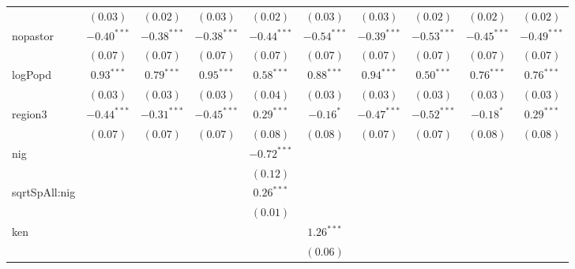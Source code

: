 \begin{sidewaystable}
\begin{center}
{\begin{tabular}{l c c c c c c c c c}
                  & $(0.03)$      & $(0.02)$      & $(0.03)$      & $(0.02)$      & $(0.03)$      & $(0.03)$      & $(0.02)$      & $(0.02)$      & $(0.02)$      \\
nopastor          & $-0.40^{***}$ & $-0.38^{***}$ & $-0.38^{***}$ & $-0.44^{***}$ & $-0.54^{***}$ & $-0.39^{***}$ & $-0.53^{***}$ & $-0.45^{***}$ & $-0.49^{***}$ \\
                  & $(0.07)$      & $(0.07)$      & $(0.07)$      & $(0.07)$      & $(0.07)$      & $(0.07)$      & $(0.07)$      & $(0.07)$      & $(0.07)$      \\
logPopd           & $0.93^{***}$  & $0.79^{***}$  & $0.95^{***}$  & $0.58^{***}$  & $0.88^{***}$  & $0.94^{***}$  & $0.50^{***}$  & $0.76^{***}$  & $0.76^{***}$  \\
                  & $(0.03)$      & $(0.03)$      & $(0.03)$      & $(0.04)$      & $(0.03)$      & $(0.03)$      & $(0.03)$      & $(0.03)$      & $(0.03)$      \\
region3           & $-0.44^{***}$ & $-0.31^{***}$ & $-0.45^{***}$ & $0.29^{***}$  & $-0.16^{*}$   & $-0.47^{***}$ & $-0.52^{***}$ & $-0.18^{*}$   & $0.29^{***}$  \\
                  & $(0.07)$      & $(0.07)$      & $(0.07)$      & $(0.08)$      & $(0.08)$      & $(0.07)$      & $(0.07)$      & $(0.08)$      & $(0.08)$      \\
nig               &               &               &               & $-0.72^{***}$ &               &               &               &               &               \\
                  &               &               &               & $(0.12)$      &               &               &               &               &               \\
sqrtSpAll:nig     &               &               &               & $0.26^{***}$  &               &               &               &               &               \\
                  &               &               &               & $(0.01)$      &               &               &               &               &               \\
ken               &               &               &               &               & $1.26^{***}$  &               &               &               &               \\
                  &               &               &               &               & $(0.06)$      &               &               &               &               \\

\end{tabular}}
\end{center}
\end{sidewaystable}
